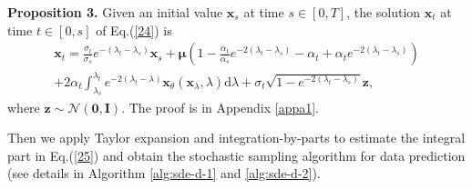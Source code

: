 \textbf{Proposition 3.} Given an initial value $\boldsymbol{x}_s$ at time $s\in[0,T]$, the solution $\boldsymbol{x}_t$ at time $t\in[0,s]$ of Eq.(\ref{24}) is 
\begin{equation}
\begin{aligned}
\boldsymbol{x}_t=\frac{\sigma_t}{\sigma_s}e^{-(\lambda_t-\lambda_s)}\boldsymbol{x}_s
+\boldsymbol\mu\left(1-\frac{\alpha_t}{\alpha_s}e^{-2(\lambda_t-\lambda_s)}-\alpha_t+\alpha_t e^{-2(\lambda_t-\lambda_s)}\right)\\
+2\alpha_t\int_{\lambda_s}^{\lambda_t}e^{-2(\lambda_t-\lambda)}\boldsymbol{x}_\theta(\boldsymbol{x}_\lambda,\lambda)\mathrm{d}\lambda
+\sigma_t\sqrt{1-e^{-2(\lambda_t-\lambda_s)}}\boldsymbol{z},
\label{25}
\end{aligned}
\end{equation}
where $\boldsymbol{z}\sim\mathcal{N}(\mathbf{0}, \boldsymbol{I})$. The proof is in Appendix \ref{appa1}.

Then we apply Taylor expansion and integration-by-parts to estimate the integral part in Eq.(\ref{25}) and obtain the stochastic sampling algorithm for data prediction (see details in Algorithm \ref{alg:sde-d-1} and \ref{alg:sde-d-2}). 


